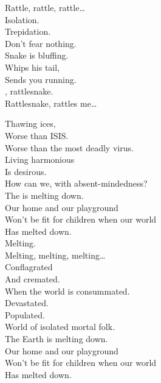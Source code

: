 Rattle, rattle, rattle… \\

Isolation. \\
Trepidation. \\
Don't fear nothing. \\
Snake is bluffing. \\
Whips his tail, \\
Sends you running. \\

, rattlesnake. \\
Rattlesnake, rattles me… \\





Thawing ices, \\
Worse than ISIS. \\
Worse than the most deadly virus. \\
Living harmonious \\
Is desirous. \\
How can we, with absent-mindedness? \\

The  is melting down. \\
Our home and our playground \\
Won't be fit for children when our world \\
Has melted down. \\

Melting. \\
Melting, melting, melting… \\

Conflagrated \\
And cremated. \\
When the world is consummated. \\
Devastated. \\
Populated. \\
World of isolated mortal folk. \\

The Earth is melting down. \\
Our home and our playground \\
Won't be fit for children when our world \\
Has melted down. \\

